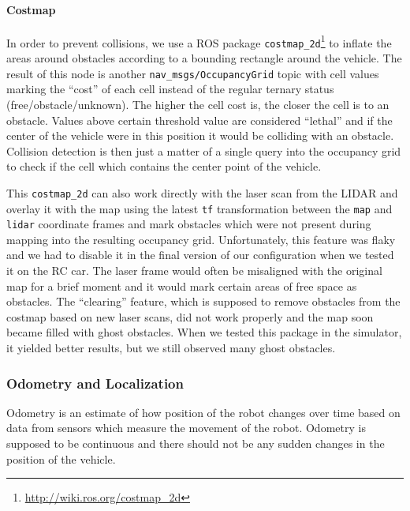 \paragraph{Costmap} In order to prevent collisions, we use a \gls*{ROS} package \verb|costmap_2d|\footnote{\url{http://wiki.ros.org/costmap\_2d}} to inflate the areas around obstacles according to a bounding rectangle around the vehicle. The result of this node is another \verb|nav_msgs/OccupancyGrid| topic with cell values marking the ``cost'' of each cell instead of the regular ternary status (free/obstacle/unknown). The higher the cell cost is, the closer the cell is to an obstacle. Values above certain threshold value are considered ``lethal'' and if the center of the vehicle were in this position it would be colliding with an obstacle. Collision detection is then just a matter of a single query into the occupancy grid to check if the cell which contains the center point of the vehicle.

This \verb|costmap_2d| can also work directly with the laser scan from the \gls*{LIDAR} and overlay it with the map using the latest \verb|tf| transformation between the \verb|map| and \verb|lidar| coordinate frames and mark obstacles which were not present during mapping into the resulting occupancy grid. Unfortunately, this feature was flaky and we had to disable it in the final version of our configuration when we tested it on the RC car. The laser frame would often be misaligned with the original map for a brief moment and it would mark certain areas of free space as obstacles. The ``clearing'' feature, which is supposed to remove obstacles from the costmap based on new laser scans, did not work properly and the map soon became filled with ghost obstacles. When we tested this package in the simulator, it yielded better results, but we still observed many ghost obstacles.

\subsubsection{Odometry and Localization}

Odometry is an estimate of how position of the robot changes over time based on data from sensors which measure the movement of the robot. Odometry is supposed to be continuous and there should not be any sudden changes in the position of the vehicle.

